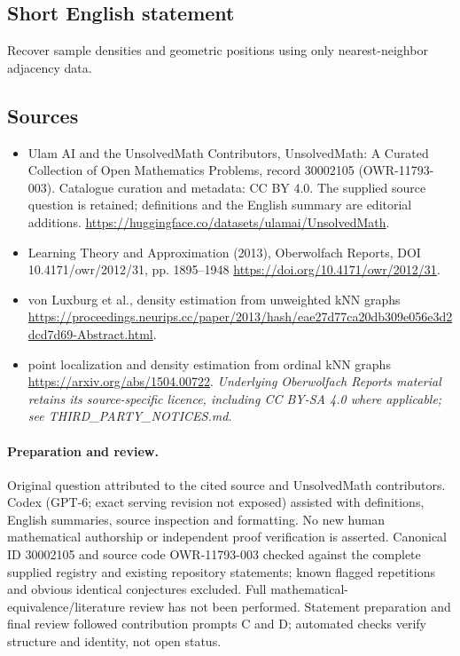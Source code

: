 \documentclass[11pt]{article}
\begin{document}
\subsection{Short English statement}
Recover sample densities and geometric positions using only nearest-neighbor adjacency data.
\subsection{Sources}
\begin{itemize}
\item[\hypertarget{source:30002105:1}{S1}] Ulam AI and the UnsolvedMath Contributors, UnsolvedMath: A Curated Collection of Open Mathematics Problems, record 30002105 (OWR-11793-003). Catalogue curation and metadata: CC BY 4.0. The supplied source question is retained; definitions and the English summary are editorial additions.
\url{https://huggingface.co/datasets/ulamai/UnsolvedMath}.
\item[\hypertarget{source:30002105:2}{S2}] Learning Theory and Approximation (2013), Oberwolfach Reports, DOI 10.4171/owr/2012/31, pp. 1895--1948
\url{https://doi.org/10.4171/owr/2012/31}.
\item[\hypertarget{source:30002105:3}{S3}] von Luxburg et al., density estimation from unweighted kNN graphs
\url{https://proceedings.neurips.cc/paper/2013/hash/eae27d77ca20db309e056e3d2dcd7d69-Abstract.html}.
\item[\hypertarget{source:30002105:4}{S4}] point localization and density estimation from ordinal kNN graphs
\url{https://arxiv.org/abs/1504.00722}.
\textit{Underlying Oberwolfach Reports material retains its source-specific licence, including CC BY-SA 4.0 where applicable; see THIRD\_PARTY\_NOTICES.md.}
\end{itemize}
\paragraph{Preparation and review.}
Original question attributed to the cited source and UnsolvedMath contributors. Codex (GPT-6; exact serving revision not exposed) assisted with definitions, English summaries, source inspection and formatting. No new human mathematical authorship or independent proof verification is asserted. Canonical ID 30002105 and source code OWR-11793-003 checked against the complete supplied registry and existing repository statements; known flagged repetitions and obvious identical conjectures excluded. Full mathematical-equivalence/literature review has not been performed. Statement preparation and final review followed contribution prompts C and D; automated checks verify structure and identity, not open status.
\label{end:30002105}
\end{document}
